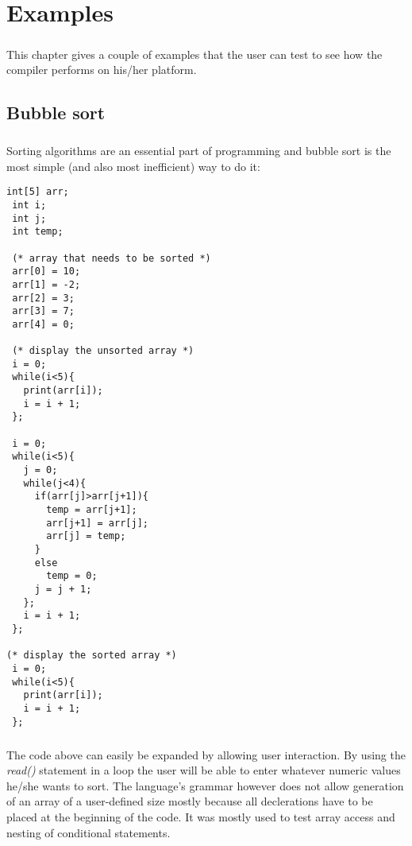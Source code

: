 \chapter{Examples}
\paragraph{}
  This chapter gives a couple of examples that the user can test to see how the compiler performs on his/her platform.
  
	\section{Bubble sort}
	\paragraph{}
  		Sorting algorithms are an essential part of programming and bubble sort is the most simple (and also most inefficient) way to do it:
    		\begin{lstlisting}[frame=single]
 int[5] arr;
 int i;
 int j;
 int temp;

 (* array that needs to be sorted *)
 arr[0] = 10;
 arr[1] = -2;
 arr[2] = 3;
 arr[3] = 7;
 arr[4] = 0;

 (* display the unsorted array *)
 i = 0;
 while(i<5){
   print(arr[i]);
   i = i + 1;
 };

 i = 0;
 while(i<5){
   j = 0;
   while(j<4){    
     if(arr[j]>arr[j+1]){
       temp = arr[j+1];
       arr[j+1] = arr[j];
       arr[j] = temp;
     }
     else
       temp = 0;
     j = j + 1;
   };
   i = i + 1;
 };

(* display the sorted array *)
 i = 0;
 while(i<5){
   print(arr[i]);
   i = i + 1;
 };
		\end{lstlisting}
				
	\paragraph{}
	  	The code above can easily be expanded by allowing user interaction. By using the \textit{read()} statement in a loop the user will be able to enter whatever numeric values he/she wants to sort. The language's grammar however does not allow generation of an array of a user-defined size mostly because all declerations have to be placed at the beginning of the code. It was mostly used to test array access and nesting of conditional statements.
	  
